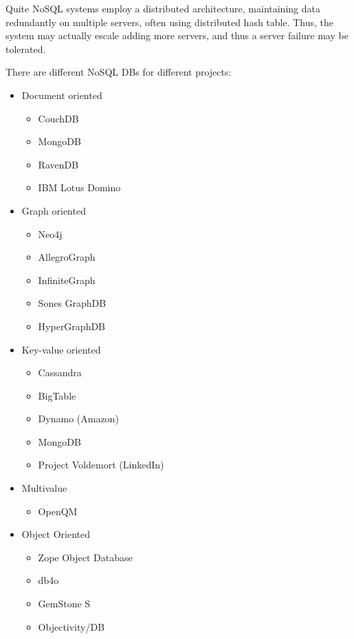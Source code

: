 Quite NoSQL systems employ a distributed architecture, maintaining data redundantly on multiple servers, often using distributed hash table. Thus, the system may actually escale adding more servers, and thus a server failure may be tolerated. 

There are different NoSQL DBs for different projects:

\begin{itemize}

\item Document oriented

  \begin{itemize}
    \item CouchDB
    \item MongoDB
    \item RavenDB
    \item IBM Lotus Domino
  \end{itemize}

\item Graph oriented

  \begin{itemize}
    \item Neo4j
    \item AllegroGraph
    \item InfiniteGraph
    \item Sones GraphDB
    \item HyperGraphDB
  \end{itemize}

\item Key-value oriented

  \begin{itemize}
    \item Cassandra
    \item BigTable
    \item Dynamo (Amazon)
    \item MongoDB
    \item Project Voldemort (LinkedIn)
  \end{itemize}

\item Multivalue

  \begin{itemize}
    \item OpenQM
  \end{itemize}  

\item Object Oriented
  
  \begin{itemize}
    \item Zope Object Database
    \item db4o
    \item GemStone S
    \item Objectivity/DB
  \end{itemize}


\end{itemize}
